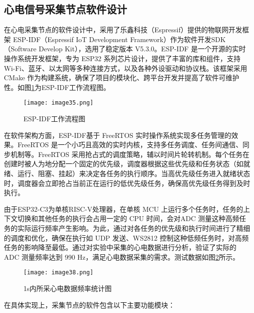 \subsection{心电信号采集节点软件设计}

在心电采集节点的软件设计中，采用了乐鑫科技（Espressif）提供的物联网开发框架 ESP-IDF（Espressif IoT Development Framework）作为软件开发SDK（Software Develop Kit），选用了稳定版本 V5.3.0。ESP-IDF 是一个开源的实时操作系统开发框架，专为 ESP32 系列芯片设计，提供了丰富的库和组件，支持 Wi-Fi、蓝牙、以太网等多种连接方式，以及各种外设驱动和协议栈。该框架采用 CMake 作为构建系统，确保了项目的模块化、跨平台开发并提高了软件可维护性。如图\ref{F.ECG_image35}为ESP-IDF工作流程图。

\begin{figure}[H]
    \centering
    \texttt{[image: image35.png]}
    \caption{ESP-IDF工作流程图\cite{espressif2025espidf}}
    \label{F.ECG_image35}
\end{figure}

在软件架构方面，ESP-IDF基于 FreeRTOS 实时操作系统实现多任务管理的效果。FreeRTOS 是一个小巧且高效的实时内核，支持多任务调度、任务间通信、同步机制等。FreeRTOS 采用抢占式的调度策略，辅以时间片轮转机制。每个任务在创建时被人为地分配一个固定的优先级，调度器根据这些优先级和任务状态（如就绪、运行、阻塞、挂起）来决定各任务的执行顺序。当高优先级任务进入就绪状态时，调度器会立即抢占当前正在运行的低优先级任务，确保高优先级任务得到及时执行。

由于ESP32-C3为单核RISC-V处理器，在单核 MCU 上运行多个任务时，任务的上下文切换和其他任务的执行会占用一定的 CPU 时间，会对ADC 测量这种高频任务的实际运行频率产生影响。为此，通过对各任务的优先级和执行时间进行了精细的调度和优化，确保在执行如 UDP 发送、WS2812 控制这种低频任务时，对高频任务的影响降至最低。通过对实验中采集的心电数据进行分析，验证了实际的 ADC 测量频率达到 990 Hz，满足心电数据采集的需求。测试数据如图\ref{F.ECG_image38}所示。

\begin{figure}[htb]
    \centering
    \texttt{[image: image38.png]}
    \caption{1s内所采心电数据频率统计图}
    \label{F.ECG_image38}
\end{figure}

在具体实现上，采集节点的软件包含以下主要功能模块：

